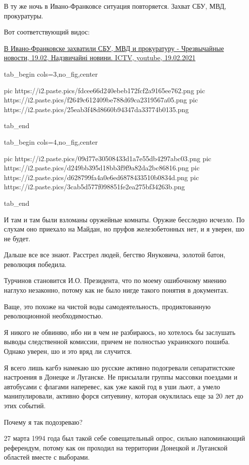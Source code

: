 В ту же ночь в Ивано-Франковсе ситуация повторяется. Захват СБУ, МВД,
прокуратуры.

Вот соответствующий видос:

\href{https://www.youtube.com/watch?v=v1mlKpVlpc8}{%
В Ивано-Франковске захватили СБУ, МВД и прокуратуру - Чрезвычайные новости, 19.02, %
Надзвичайні новини. ICTV, youtube, 19.02.2021%
}

\ifcmt
  tab_begin cols=3,no_fig,center

     pic https://i2.paste.pics/fdcee66d240ebeb172fcf2a9165ee762.png
		 pic https://i2.paste.pics/f2649c612409be788d69ca2319567a05.png
		 pic https://i2.paste.pics/25eab3f48d8660b94347da33774b0135.png

  tab_end

  tab_begin cols=4,no_fig,center

		 pic https://i2.paste.pics/09d77e30508433d1a7e55db4297abc03.png
		 pic https://i2.paste.pics/d249bb395d18bb3f9f9a82da2bc86816.png
		 pic https://i2.paste.pics/d628799fa4a0e6ed6878433510b0834d.png
		 pic https://i2.paste.pics/3cab5d577f098851fe2ea275bf34263b.png

  tab_end
\fi

И там и там были взломаны оружейные комнаты. Оружие бесследно исчезло. По
слухам оно приехало на Майдан, но пруфов железобетонных нет, и я уверен, шо не
будет.

Дальше все все знают. Расстрел людей, бегство Януковича, золотой батон,
революция победила.

Турчинов становится И.О. Президента, что по моему ошибочному мнению наглухо
незаконно, потому как не было нигде такого понятия в документах.

Ваще, это похоже на чистой воды самодеятельность, продиктованную революционной
необходимостью.

Я никого не обвиняю, ибо ни в чем не разбираюсь, но хотелось бы заслушать
выводы следственной комиссии, причем не полностью украинского пошиба. Однако
уверен, шо и это вряд ли случится.

Я всего лишь кагбэ намекаю шо русские активно подогревали сепаратистские
настроения в Донецке и Луганске. Не присылали группы массовки поездами и
автобусами с флагами наперевес, как уже какой год в уши льют, а умело
манипулировали, активно форся ситуевину, которая окуклилась еще за 20 лет до
этих событий.

Почему я так подозреваю?

27 марта 1994 года был такой себе совещательный опрос, сильно напоминающий
референдум, потому как он проходил на территории Донецкой и Луганской областей
вместе с выборами.

